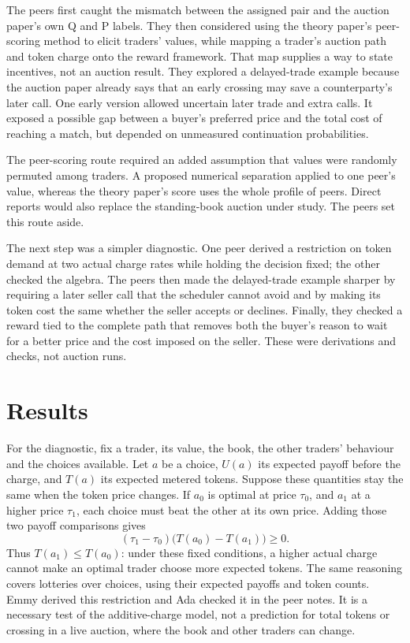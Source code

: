 \documentclass{article}
\begin{document}
The peers first caught the mismatch between the assigned pair and the auction paper's own Q and P
labels. They then considered using the theory paper's peer-scoring method to elicit traders' values,
while mapping a trader's auction path and token charge onto the reward framework. That map supplies
a way to state incentives, not an auction result. They explored a delayed-trade example because the
auction paper already says that an early crossing may save a counterparty's later call. One early
version allowed uncertain later trade and extra calls. It exposed a possible gap between a buyer's
preferred price and the total cost of reaching a match, but depended on unmeasured continuation
probabilities.

The peer-scoring route required an added assumption that values were randomly permuted among
traders. A proposed numerical separation applied to one peer's value, whereas the theory paper's
score uses the whole profile of peers. Direct reports would also replace the standing-book auction
under study. The peers set this route aside.

The next step was a simpler diagnostic. One peer derived a restriction on token demand at two actual
charge rates while holding the decision fixed; the other checked the algebra. The peers then made
the delayed-trade example sharper by requiring a later seller call that the scheduler cannot avoid
and by making its token cost the same whether the seller accepts or declines. Finally, they checked
a reward tied to the complete path that removes both the buyer's reason to wait for a better price
and the cost imposed on the seller. These were derivations and checks, not auction runs.

\section{Results}

For the diagnostic, fix a trader, its value, the book, the other traders' behaviour and the choices
available. Let \(a\) be a choice, \(U(a)\) its expected payoff before the charge, and \(T(a)\) its
expected metered tokens. Suppose these quantities stay the same when the token price changes. If
\(a_0\) is optimal at price \(\tau_0\), and \(a_1\) at a higher price \(\tau_1\), each choice must
beat the other at its own price. Adding those two payoff comparisons gives
\[
(\tau_1-\tau_0)\bigl(T(a_0)-T(a_1)\bigr)\geq 0.
\]
Thus \(T(a_1)\leq T(a_0)\): under these fixed conditions, a higher actual charge cannot make an
optimal trader choose more expected tokens. The same reasoning covers lotteries over choices, using
their expected payoffs and token counts. Emmy derived this restriction and Ada checked it in the
peer notes. It is a necessary test of the additive-charge model, not a prediction for total tokens
or crossing in a live auction, where the book and other traders can change.
\end{document}
